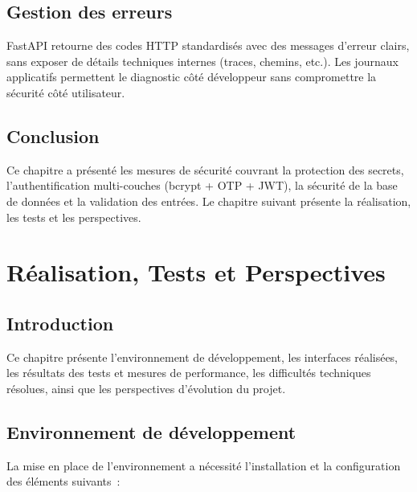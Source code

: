\documentclass[12pt,a4paper]{report}
\begin{document}
\section{Gestion des erreurs}

FastAPI retourne des codes HTTP standardisés avec des messages d'erreur clairs, sans exposer de détails techniques internes (traces, chemins, etc.). Les journaux applicatifs permettent le diagnostic côté développeur sans compromettre la sécurité côté utilisateur.

\section{Conclusion}

Ce chapitre a présenté les mesures de sécurité couvrant la protection des secrets, l'authentification multi-couches (bcrypt + OTP + JWT), la sécurité de la base de données et la validation des entrées. Le chapitre suivant présente la réalisation, les tests et les perspectives.

\chapter{Réalisation, Tests et Perspectives}
\label{chap:realisation}

\section{Introduction}

Ce chapitre présente l'environnement de développement, les interfaces réalisées, les résultats des tests et mesures de performance, les difficultés techniques résolues, ainsi que les perspectives d'évolution du projet.

\section{Environnement de développement}

La mise en place de l'environnement a nécessité l'installation et la configuration des éléments suivants~:
\end{document}
